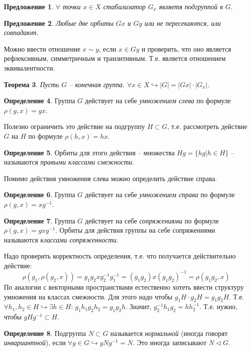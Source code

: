 \documentclass[12pt]{article}
\newtheorem{theorem}{Теорема}
\newtheorem{predl}[theorem]{Предложение}
\theoremstyle{definition}
\newtheorem{defin}[theorem]{Определение}
\begin{document}
\begin{predl}
    $\forall$ точки $x\in X$ стабилизатор $G_x$ являетя подгруппой в $G$.
\end{predl}
\begin{predl}
    Любые две орбиты $Gx$ и $Gy$ или не пересекаются, или совпадают.
\end{predl}
Можно ввести отношение $x\sim y$, если $x\in Gy$ и проверить, что оно является рефлексивным, симметричным и транзитивным. Т.е. является отношением эквивалентности.
\begin{theorem}
    Пусть $G$ -- конечная группа. $\forall x\in X\hookrightarrow|G| = |Gx|\cdot|G_x|$.
\end{theorem}
\begin{defin}
Группа $G$ действует на себе \textit{умножением слева} по формуле $\rho(g,x)=gx$.
\end{defin}
Полезно ограничить это действие на подгруппу $H\subset G$, т.е. рассмотреть действие $G$ на $H$ по формуле $\rho(h,x)=hx$.
\begin{defin}
Орбиты для этого действия -- множества $Hg=\{hg|h\in H\}$ -- называются \textit{правыми классами смежности}.
\end{defin}
Помимо действия умножения слева можно определить действие справа.
\begin{defin}
Группа $G$ действует на себе \textit{умножением справа} по формуле $\rho(g,x)=xg^{-1}$.
\end{defin}
\begin{defin}
Группа $G$ действует на себе \textit{сопряжениями} по формуле $\rho(g,x)=gxg^{-1}$. Орбиты для действия группы на себе сопряжениями называются \textit{классами сопряженности}.
\end{defin}
Надо проверить корректность определения, т.е. что получается действительно действие:
\begin{equation}
    \rho(g_1,\rho(g_2,x))=g_1g_2xg^{-1}_2g^{-1}_1=(g_1g_2)x(g_1g_2)^{-1}=\rho(g_1g_2,x)
\end{equation}
По аналогии с векторными пространствами естественно хотеть ввести структуру умножения на классах смежности. Для этого надо чтобы $g_1H\cdot g_2H=g_1g_2H$. Т.е. $\forall h_1,h_2\in H\hookrightarrow\exists h\in H$: $g_1h_1g_2h_2=g_1g_2h$. Значит, $g_2^{-1}h_1g_2=hh_2^{-1}$. Т.е. нужно, чтобы $gHg^{-1}\subset H$.
\begin{defin}
Подгруппа $N\subset G$ называется \textit{нормальной} (иногда говорят \textit{инвариантной}), если $\forall g\in G\hookrightarrow gNg^{-1}=N$. Это иногда записывают $N\lhd G$.
\end{defin}
\end{document}
